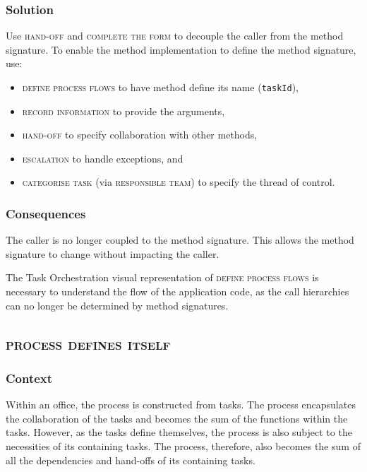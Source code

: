 \documentclass[prodmode]{style/acmlarge}
\begin{document}
\subsubsection*{\textbf{Solution}} Use \textsc{hand-off} and \textsc{complete the form}
to decouple the caller from the method signature.  To enable the method
implementation to define the method signature, use:
\begin{itemize}
  \item \textsc{define process flows} to have method define its name (\texttt{taskId}),
  \item \textsc{record information} to provide the arguments,
  \item \textsc{hand-off} to specify collaboration with other methods,
  \item \textsc{escalation} to handle exceptions, and
  \item \textsc{categorise task} (via \textsc{responsible team}) to specify the thread of control.    
\end{itemize}

\subsubsection*{Consequences} The caller is no longer coupled to the method
signature.  This allows the method signature to change without impacting the
caller.

The Task Orchestration visual representation of \textsc{define process flows} is
necessary to understand the flow of the application code, as the call
hierarchies can no longer be determined by method signatures.



\subsection{\textsc{\textbf{process defines itself}}}

\subsubsection*{Context} Within an office, the process is constructed from
tasks.  The process encapsulates the collaboration of the tasks and becomes the
sum of the functions within the tasks.  However, as the tasks define themselves,
the process is also subject to the necessities of its containing tasks.  The
process, therefore, also becomes the sum of all the dependencies and hand-offs
of its containing tasks.
\end{document}
